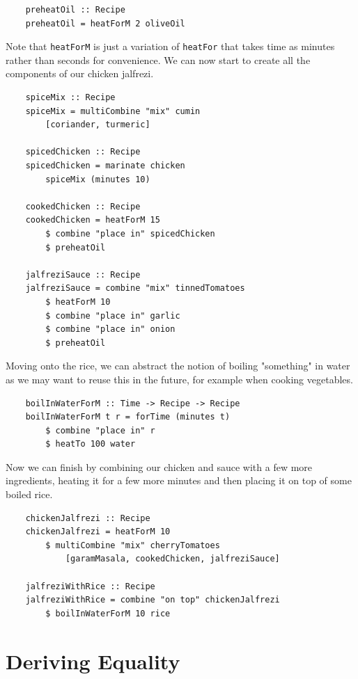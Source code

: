 \documentclass[11pt]{article}
\begin{document}
\begin{lstlisting}
    preheatOil :: Recipe
    preheatOil = heatForM 2 oliveOil
\end{lstlisting}

Note that \texttt{heatForM} is just a variation of \texttt{heatFor} that takes time as
minutes rather than seconds for convenience. We can now start to create all the
components of our chicken jalfrezi.

\begin{lstlisting}
    spiceMix :: Recipe
    spiceMix = multiCombine "mix" cumin
        [coriander, turmeric]

    spicedChicken :: Recipe
    spicedChicken = marinate chicken
        spiceMix (minutes 10)

    cookedChicken :: Recipe
    cookedChicken = heatForM 15
        $ combine "place in" spicedChicken
        $ preheatOil

    jalfreziSauce :: Recipe
    jalfreziSauce = combine "mix" tinnedTomatoes
        $ heatForM 10
        $ combine "place in" garlic
        $ combine "place in" onion
        $ preheatOil
\end{lstlisting}

Moving onto the rice, we can abstract the notion of boiling "something" in water as we may
want to reuse this in the future, for example when cooking vegetables.

\begin{lstlisting}
    boilInWaterForM :: Time -> Recipe -> Recipe
    boilInWaterForM t r = forTime (minutes t) 
        $ combine "place in" r
        $ heatTo 100 water
\end{lstlisting}

Now we can finish by combining our chicken and sauce with a few more ingredients,
heating it for a few more minutes and then placing it on top of some boiled rice.

\begin{lstlisting}
    chickenJalfrezi :: Recipe
    chickenJalfrezi = heatForM 10
        $ multiCombine "mix" cherryTomatoes
            [garamMasala, cookedChicken, jalfreziSauce]

    jalfreziWithRice :: Recipe
    jalfreziWithRice = combine "on top" chickenJalfrezi
        $ boilInWaterForM 10 rice
\end{lstlisting}

\section{Deriving Equality}
\end{document}
